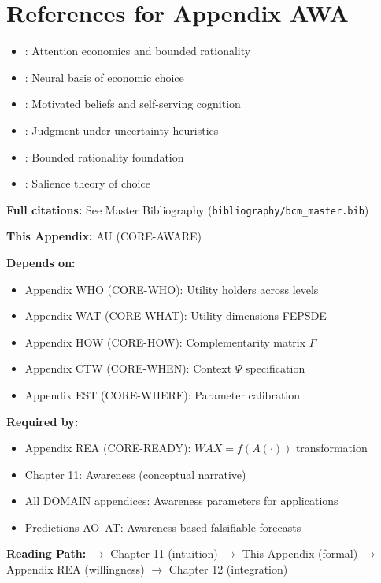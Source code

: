 \section{References for Appendix AWA}
\label{sec:au-references}

\begin{itemize}[nosep]
    \item \citet{kahneman2003}: Attention economics and bounded rationality
    \item \citet{rangel2008}: Neural basis of economic choice
    \item \citet{fehrrangel2011}: Motivated beliefs and self-serving cognition
    \item \citet{tversky1974}: Judgment under uncertainty heuristics
    \item \citet{simon1955}: Bounded rationality foundation
    \item \citet{bordalo2012}: Salience theory of choice
\end{itemize}

\textbf{Full citations:} See Master Bibliography (\texttt{bibliography/bcm\_master.bib})


\begin{tcolorbox}[colback=gray!10!white, colframe=gray!75!black,
    title=\textbf{Cross-Reference Footer}]

\textbf{This Appendix:} AU (CORE-AWARE)

\textbf{Depends on:}
\begin{itemize}[nosep]
    \item Appendix WHO (CORE-WHO): Utility holders across levels
    \item Appendix WAT (CORE-WHAT): Utility dimensions FEPSDE
    \item Appendix HOW (CORE-HOW): Complementarity matrix $\Gamma$
    \item Appendix CTW (CORE-WHEN): Context $\Psi$ specification
    \item Appendix EST (CORE-WHERE): Parameter calibration
\end{itemize}

\textbf{Required by:}
\begin{itemize}[nosep]
    \item Appendix REA (CORE-READY): $WAX = f(A(\cdot))$ transformation
    \item Chapter 11: Awareness (conceptual narrative)
    \item All DOMAIN appendices: Awareness parameters for applications
    \item Predictions AO--AT: Awareness-based falsifiable forecasts
\end{itemize}

\textbf{Reading Path:}
$\rightarrow$ Chapter 11 (intuition) $\rightarrow$ This Appendix (formal)
$\rightarrow$ Appendix REA (willingness) $\rightarrow$ Chapter 12 (integration)

\end{tcolorbox}


